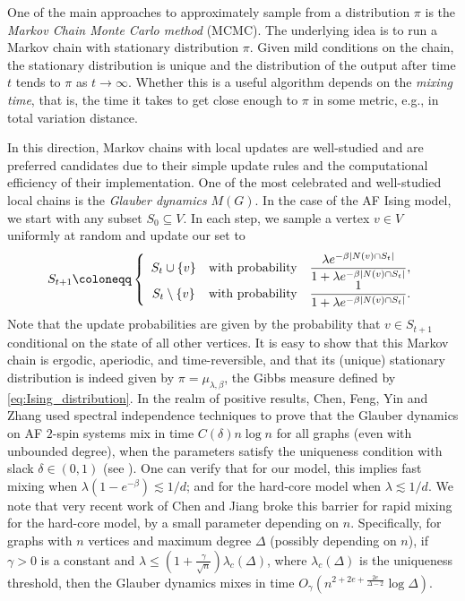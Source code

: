\documentclass[reqno,a4paper,11pt]{amsart}
\newcommand{\lam}{\lambda}
\begin{document}
One of the main approaches to approximately sample from a distribution $\pi$ is the \textit{Markov Chain Monte Carlo method} (MCMC). The underlying idea is to run a Markov chain with stationary distribution $\pi$. Given mild conditions on the chain, the stationary distribution is unique and the distribution of the output after time $t$ tends to $\pi$ as $t\rightarrow\infty$. Whether this is a useful algorithm depends on the \textit{mixing time}, that is, the time it takes to get close enough to $\pi$ in some metric, e.g., in total variation distance.

In this direction, Markov chains with local updates are well-studied and are preferred candidates due to their simple update rules and the computational efficiency of their implementation. One of the most celebrated and well-studied local chains is the \textit{Glauber dynamics} $M(G)$. In the case of the AF Ising model, we start with any subset $S_0 \subseteq V$. In each step, we sample a vertex $v \in V$ uniformly at random and update our set to
\begin{align*}
    S_{t+1} \coloneqq \left\{\begin{array} {c@{\quad \textup{with probability} \quad}l}
       S_t \cup \{v\} & \dfrac{\lambda e^{-\beta |N(v) \cap S_t|}}{1+\lambda e^{-\beta |N(v) \cap S_t|}}, \\[+1ex]
      S_t \setminus \{v\} & \dfrac{1}{1+\lambda e^{-\beta |N(v) \cap S_t|}}.
    \end{array}\right.
\end{align*}
Note that the update probabilities are given by the probability that $v \in S_{t+1}$ conditional on the state of all other vertices. It is easy to show that this Markov chain is ergodic, aperiodic, and time-reversible, and that its (unique) stationary distribution is indeed given by $\pi = \mu_{\lambda, \beta}$, the Gibbs measure defined by \eqref{eq:Ising_distribution}. In the realm of positive results, Chen, Feng, Yin and Zhang \cite{CheFeZhaYi22} used spectral independence techniques to prove that the Glauber dynamics on AF $2$-spin systems mix in time $C(\delta)n\log n$ for all graphs (even with unbounded degree), when the parameters satisfy the uniqueness condition with slack $\delta\in(0,1)$ (see \cite[Definition 3.1]{CheFeZhaYi22}). One can verify that for our model, this implies fast mixing when $\lam(1-e^{-\beta})\lesssim 1/d$; and for the hard-core model when $\lam\lesssim 1/d$.
We note that very recent work of Chen and Jiang \cite{Chen2025Improved} broke this barrier for rapid mixing for the hard-core model, by a small parameter depending on $n$. Specifically, for graphs with $n$ vertices and maximum degree $\Delta$ (possibly depending on $n$), if $\gamma > 0$ is a constant and $\lam\leq\left(1+\frac{\gamma}{\sqrt{n}}\right)\lam_c(\Delta)$, where $\lam_c(\Delta)$ is the uniqueness threshold, then the Glauber dynamics mixes in time $O_\gamma\left(n^{2+2e+\frac{2e}{\Delta-2}}\log\Delta\right).$ 
\end{document}
